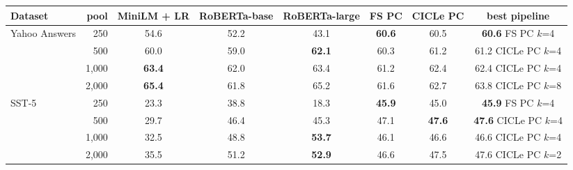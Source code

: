 \begin{tabular}{lrcccccc}
\toprule
Dataset & pool & MiniLM + LR & RoBERTa-base & RoBERTa-large & FS PC & CICLe PC & best pipeline \\
\midrule
Yahoo Answers & 250 & 54.6 & 52.2 & 43.1 & \textbf{60.6} & 60.5 & \textbf{60.6} {\scriptsize FS PC $k$=4} \\
 & 500 & 60.0 & 59.0 & \textbf{62.1} & 60.3 & 61.2 & 61.2 {\scriptsize CICLe PC $k$=4} \\
 & 1,000 & \textbf{63.4} & 62.0 & 63.4 & 61.2 & 62.4 & 62.4 {\scriptsize CICLe PC $k$=4} \\
 & 2,000 & \textbf{65.4} & 61.8 & 65.2 & 61.6 & 62.7 & 63.8 {\scriptsize CICLe PC $k$=8} \\
\midrule
SST-5 & 250 & 23.3 & 38.8 & 18.3 & \textbf{45.9} & 45.0 & \textbf{45.9} {\scriptsize FS PC $k$=4} \\
 & 500 & 29.7 & 46.4 & 45.3 & 47.1 & \textbf{47.6} & \textbf{47.6} {\scriptsize CICLe PC $k$=4} \\
 & 1,000 & 32.5 & 48.8 & \textbf{53.7} & 46.1 & 46.6 & 46.6 {\scriptsize CICLe PC $k$=4} \\
 & 2,000 & 35.5 & 51.2 & \textbf{52.9} & 46.6 & 47.5 & 47.6 {\scriptsize CICLe PC $k$=2} \\
\bottomrule
\end{tabular}
